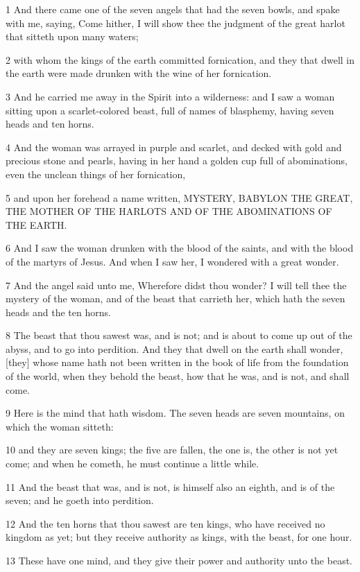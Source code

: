 \par 1 And there came one of the seven angels that had the seven bowls, and spake with me, saying, Come hither, I will show thee the judgment of the great harlot that sitteth upon many waters;
\par 2 with whom the kings of the earth committed fornication, and they that dwell in the earth were made drunken with the wine of her fornication.
\par 3 And he carried me away in the Spirit into a wilderness: and I saw a woman sitting upon a scarlet-colored beast, full of names of blasphemy, having seven heads and ten horns.
\par 4 And the woman was arrayed in purple and scarlet, and decked with gold and precious stone and pearls, having in her hand a golden cup full of abominations, even the unclean things of her fornication,
\par 5 and upon her forehead a name written, MYSTERY, BABYLON THE GREAT, THE MOTHER OF THE HARLOTS AND OF THE ABOMINATIONS OF THE EARTH.
\par 6 And I saw the woman drunken with the blood of the saints, and with the blood of the martyrs of Jesus. And when I saw her, I wondered with a great wonder.
\par 7 And the angel said unto me, Wherefore didst thou wonder? I will tell thee the mystery of the woman, and of the beast that carrieth her, which hath the seven heads and the ten horns.
\par 8 The beast that thou sawest was, and is not; and is about to come up out of the abyss, and to go into perdition. And they that dwell on the earth shall wonder, [they] whose name hath not been written in the book of life from the foundation of the world, when they behold the beast, how that he was, and is not, and shall come.
\par 9 Here is the mind that hath wisdom. The seven heads are seven mountains, on which the woman sitteth:
\par 10 and they are seven kings; the five are fallen, the one is, the other is not yet come; and when he cometh, he must continue a little while.
\par 11 And the beast that was, and is not, is himself also an eighth, and is of the seven; and he goeth into perdition.
\par 12 And the ten horns that thou sawest are ten kings, who have received no kingdom as yet; but they receive authority as kings, with the beast, for one hour.
\par 13 These have one mind, and they give their power and authority unto the beast.
